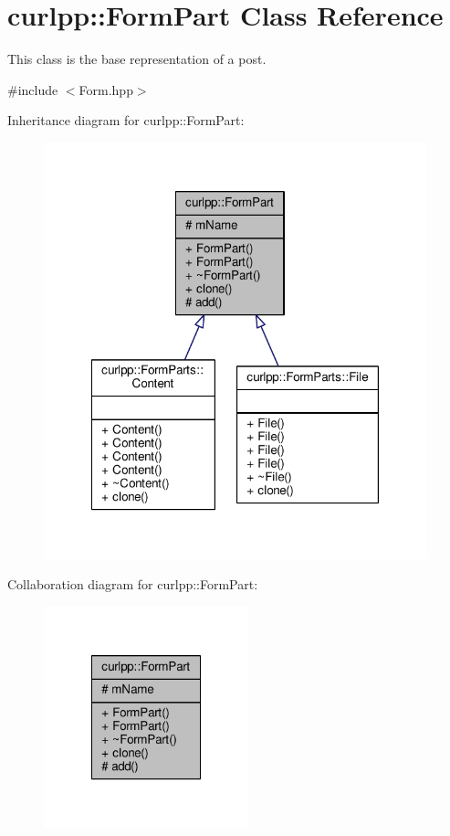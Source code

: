 \hypertarget{classcurlpp_1_1FormPart}{\section{curlpp\-:\-:Form\-Part Class Reference}
\label{classcurlpp_1_1FormPart}
}


This class is the base representation of a post.  




{\ttfamily \#include $<$Form.\-hpp$>$}



Inheritance diagram for curlpp\-:\-:Form\-Part\-:
\nopagebreak
\begin{figure}[H]
\begin{center}
\leavevmode
\includegraphics[width=315pt]{classcurlpp_1_1FormPart__inherit__graph}
\end{center}
\end{figure}


Collaboration diagram for curlpp\-:\-:Form\-Part\-:
\nopagebreak
\begin{figure}[H]
\begin{center}
\leavevmode
\includegraphics[width=168pt]{classcurlpp_1_1FormPart__coll__graph}
\end{center}
\end{figure}
